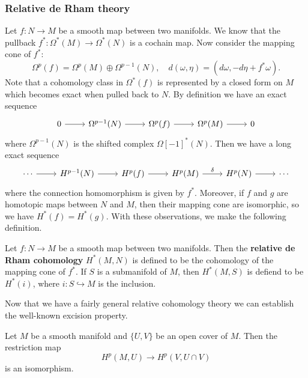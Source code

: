 \subsubsection{Relative de Rham theory}
Let $f:N\to M$ be a smooth map between two manifolds. We know that the pullback $f^*:\Omega^*(M)\to\Omega^*(N)$ is a cochain map. Now consider the mapping cone of $f^*$:
\[\Omega^p(f)=\Omega^{p}(M)\oplus\Omega^{p-1}(N),\quad d(\omega,\eta)=(d\omega,-d\eta+f^*\omega).\]
Note that a cohomology class in $\Omega^*(f)$ is represented by a closed form on $M$ which becomes exact when pulled back to $N$. By definition we have an exact 
sequence
\[\begin{tikzcd}
0\ar[r]&\Omega^{p-1}(N)\ar[r]&\Omega^p(f)\ar[r]&\Omega^{p}(M)\ar[r]&0
\end{tikzcd}\]
where $\Omega^{p-1}(N)$ is the shifted complex $\Omega[-1]^*(N)$. Then we have a long exact sequence
\[\begin{tikzcd}
\cdots\ar[r]&H^{p-1}(N)\ar[r]&H^p(f)\ar[r]&H^{p}(M)\ar[r,"\delta"]&H^{p}(N)\ar[r]&\cdots
\end{tikzcd}\]
where the connection homomorphism is given by $f^*$. Moreover, if $f$ and $g$ are homotopic maps between $N$ and $M$, then their mapping cone are isomorphic, so we have 
$H^*(f)=H^*(g)$. With these observations, we make the following definition.
\begin{definition}
Let $f:N\to M$ be a smooth map between two manifolds. Then the \textbf{relative de Rham cohomology} $H^*(M,N)$ is defined to be the cohomology of the mapping cone of 
$f^*$. If $S$ is a submanifold of $M$, then $H^*(M,S)$ is defiend to be $H^*(i)$, where $i:S\hookrightarrow M$ is the inclusion.
\end{definition}
Now that we have a fairly general relative cohomology theory we can establish the well-known excision property.
\begin{proposition}
Let $M$ be a smooth manifold and $\{U,V\}$ be an open cover of $M$. Then the restriction map
\[H^p(M,U)\to H^p(V,U\cap V)\]
is an isomorphism.
\end{proposition}
